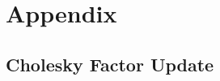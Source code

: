 \documentclass{acmtrans2m}
\begin{document}
% 
% 
% 
% 


\appendix

\section{Appendix} \label{sec:Appendix}

\subsection{Cholesky Factor Update} \label{sec:CholeskyUpdate}

\small
\end{document}
